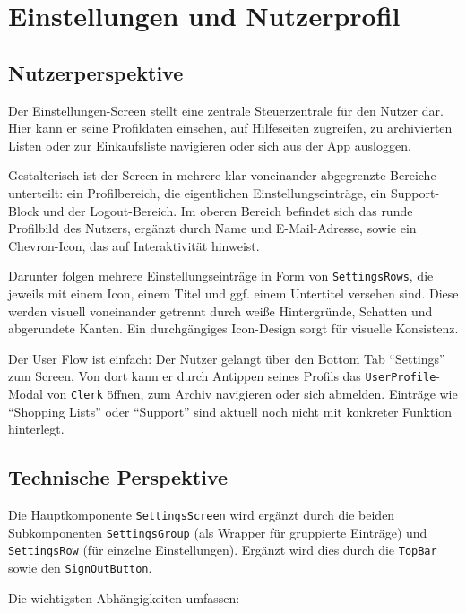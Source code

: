 \section{Einstellungen und Nutzerprofil}

\subsection{Nutzerperspektive}

Der Einstellungen-Screen stellt eine zentrale Steuerzentrale für den Nutzer dar. Hier kann er seine Profildaten einsehen, auf Hilfeseiten zugreifen, zu archivierten Listen oder zur Einkaufsliste navigieren oder sich aus der App ausloggen.

Gestalterisch ist der Screen in mehrere klar voneinander abgegrenzte Bereiche unterteilt: ein Profilbereich, die eigentlichen Einstellungseinträge, ein Support-Block und der Logout-Bereich. Im oberen Bereich befindet sich das runde Profilbild des Nutzers, ergänzt durch Name und E-Mail-Adresse, sowie ein Chevron-Icon, das auf Interaktivität hinweist.

Darunter folgen mehrere Einstellungseinträge in Form von \texttt{SettingsRows}, die jeweils mit einem Icon, einem Titel und ggf. einem Untertitel versehen sind. Diese werden visuell voneinander getrennt durch weiße Hintergründe, Schatten und abgerundete Kanten. Ein durchgängiges Icon-Design sorgt für visuelle Konsistenz.

Der User Flow ist einfach: Der Nutzer gelangt über den Bottom Tab \enquote{Settings} zum Screen. Von dort kann er durch Antippen seines Profils das \texttt{UserProfile}-Modal von \texttt{Clerk} öffnen, zum Archiv navigieren oder sich abmelden. Einträge wie \enquote{Shopping Lists} oder \enquote{Support} sind aktuell noch nicht mit konkreter Funktion hinterlegt.

\subsection{Technische Perspektive}

Die Hauptkomponente \texttt{SettingsScreen} wird ergänzt durch die beiden Subkomponenten \texttt{SettingsGroup} (als Wrapper für gruppierte Einträge) und \texttt{SettingsRow} (für einzelne Einstellungen). Ergänzt wird dies durch die \texttt{TopBar} sowie den \texttt{SignOutButton}.

Die wichtigsten Abhängigkeiten umfassen:

